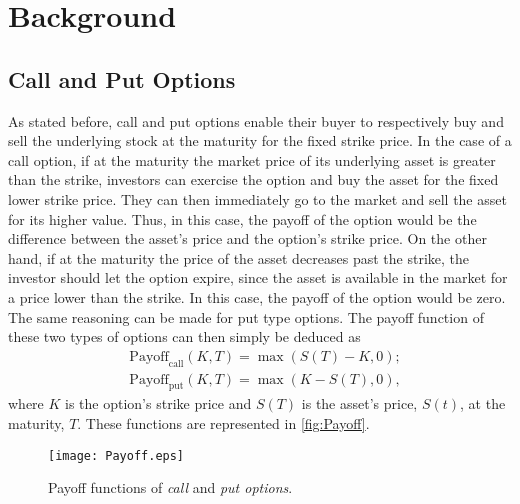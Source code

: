 \chapter{Background}
\label{chapter:background}
\section{Call and Put Options}
As stated before, call and put options enable their buyer to respectively buy and sell the underlying stock at the maturity for the fixed strike price.
In the case of a call option, if at the maturity the market price of its underlying asset is greater than the strike, investors can exercise the option and buy the asset for the fixed lower strike price. They can then immediately go to the market and sell the asset for its higher value. Thus, in this case, the payoff of the option would be the difference between the asset's price and the option's strike price. On the other hand, if at the maturity the price of the asset decreases past the strike, the investor should let the option expire, since the asset is available in the market for a price lower than the strike. In this case, the payoff of the option would be zero.
The same reasoning can be made for put type options.
The payoff function of these two types of options can then simply be deduced as
\begin{equation}\label{callput}
\begin{split}
&\text{Payoff}_\text{call}(K,T)=\max\left(S(T)-K,0\right);\\
&\text{Payoff}_\text{put}(K,T)=\max\left(K-S(T),0\right),
\end{split}
\end{equation}
\noindent where $K$ is the option's strike price and $S(T)$ is the asset's price, $S(t)$, at the maturity, $T$. These functions are represented in \autoref{fig:Payoff}.

\begin{figure}[!htb]
    \centering
      \texttt{[image: Payoff.eps]}
      \caption[Payoff functions of call and put options]{Payoff functions of \emph{call} and \emph{put options}.}\label{fig:Payoff}
    \end{figure}
    
